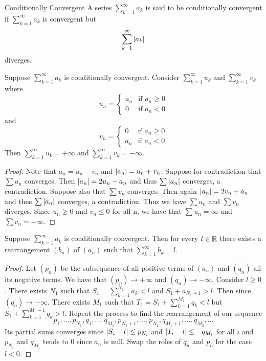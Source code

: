 \documentclass[a4paper]{article}
\begin{document}
\begin{defn}{Conditionally Convergent}{} A series $\sum_{k=1}^{\infty}a_k$ is said to be conditionally convergent if $\sum_{k=1}^{\infty}a_k$ is convergent but $$\sum_{k=1}^{\infty}\abs{a_k}$$ diverges. 
\end{defn}

\begin{thm}{}{} Suppose $\sum_{k=1}^{\infty}a_k$ is conditionally convergent. Consider $\sum_{k=1}^{\infty}u_k$ and $\sum_{k=1}^{\infty}v_k$ where $$u_n=\begin{cases}
a_n & \text{if $a_n\geq0$} \\
0 & \text{if $a_n<0$}
\end{cases}$$
and
$$v_n=\begin{cases}
0 & \text{if $a_n\geq0$} \\
a_n & \text{if $a_n<0$}
\end{cases}$$
Then $\sum_{k=1}^{\infty}u_k=+\infty$ and $\sum_{k=1}^{\infty}v_k=-\infty$. \tcbline
\begin{proof}
Note that $a_n=u_n-v_n$ and $\abs{a_n}=u_n+v_n$. Suppose for contradiction that $\sum u_n$ converges. Then $\abs{a_n}=2u_n-a_n$ and thus $\sum\abs{a_n}$ converges, a contradiction. Suppose also that $\sum v_n$ converges. Then again $\abs{a_n}=2v_n+a_n$ and thus $\sum\abs{a_n}$ converges, a contradiction. Thus we have $\sum u_n$ and $\sum v_n$ diverges. Since $u_n\geq 0$ and $v_n\leq 0$ for all n, we have that $\sum u_n=\infty$ and $\sum v_n=-\infty$. 
\end{proof}
\end{thm}

\begin{thm}{}{} Suppose $\sum_{k=1}^{\infty}a_k$ is conditionally convergent. Then for every $l\in\mathbb{R}$ there exists a rearrangement $(b_n)$ of $(a_n)$ such that $\sum_{k=1}^{\infty}b_k=l$. \tcbline
\begin{proof}
Let $(p_n)$ be the subsequence of all positive terms of $(a_n)$ and $(q_n)$ all its negative terms. We have that $(p_n)\to+\infty$ and $(q_n)\to-\infty$. Consider $l\geq0$. There exists $N_1$ such that $S_1=\sum_{k=1}^{N_1}a_k<l$ and $S_1+a_{N_1+1}>l$. Then since $(q_n)\to-\infty$. There exists $M_1$ such that $T_1=S_1+\sum_{k=1}^{M_1}q_k<l$ but $S_1+\sum_{k=1}^{M_1-1}q_k>l$. Repeat the process to find the rearrangement of our sequence $$p_1,\dots,p_{N_1},q_1,\dots,q_{M_1},p_{N_1+1},\dots,p_{N_2},q_{M_1+1},\dots,q_{M_2},\dots$$
Its partial sums converges since $\abs{S_i-l}\leq p_{N_i}$ and $\abs{T_i-l}\leq -q_{M_i}$ for all $i$ and $p_{N_i}$ and $q_{M_i}$ tends to $0$ since $a_n$ is null. Swap the roles of $q_n$ and $p_n$ for the case $l<0$. 
\end{proof}
\end{thm}
\end{document}
